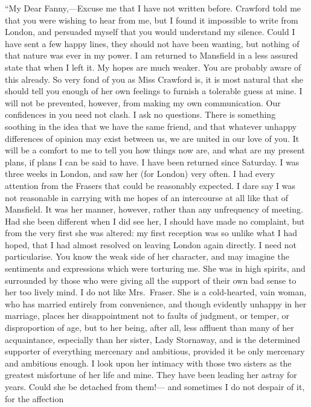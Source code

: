 ``My Dear Fanny,---Excuse me that I have not written before.
Crawford told me that you were wishing to hear from me,
but I found it impossible to write from London,
and persuaded myself that you would understand my silence.
Could I have sent a few happy lines, they should not
have been wanting, but nothing of that nature was ever
in my power.  I am returned to Mansfield in a less assured
state that when I left it.  My hopes are much weaker.
You are probably aware of this already.  So very fond of you
as Miss Crawford is, it is most natural that she should tell
you enough of her own feelings to furnish a tolerable guess
at mine.  I will not be prevented, however, from making my
own communication.  Our confidences in you need not clash.
I ask no questions.  There is something soothing in the
idea that we have the same friend, and that whatever
unhappy differences of opinion may exist between us,
we are united in our love of you.  It will be a comfort
to me to tell you how things now are, and what are my
present plans, if plans I can be said to have.  I have been
returned since Saturday.  I was three weeks in London,
and saw her (for London) very often.  I had every attention
from the Frasers that could be reasonably expected.
I dare say I was not reasonable in carrying with me
hopes of an intercourse at all like that of Mansfield.
It was her manner, however, rather than any unfrequency
of meeting.  Had she been different when I did see her,
I should have made no complaint, but from the very first
she was altered:  my first reception was so unlike
what I had hoped, that I had almost resolved on leaving
London again directly.  I need not particularise.
You know the weak side of her character, and may imagine
the sentiments and expressions which were torturing me.
She was in high spirits, and surrounded by those who
were giving all the support of their own bad sense
to her too lively mind.  I do not like Mrs.\ Fraser.
She is a cold-hearted, vain woman, who has married entirely
from convenience, and though evidently unhappy in her marriage,
places her disappointment not to faults of judgment,
or temper, or disproportion of age, but to her being,
after all, less affluent than many of her acquaintance,
especially than her sister, Lady Stornaway, and is the
determined supporter of everything mercenary and ambitious,
provided it be only mercenary and ambitious enough.  I look
upon her intimacy with those two sisters as the greatest
misfortune of her life and mine.  They have been leading
her astray for years.  Could she be detached from them!---%
and sometimes I do not despair of it, for the affection
